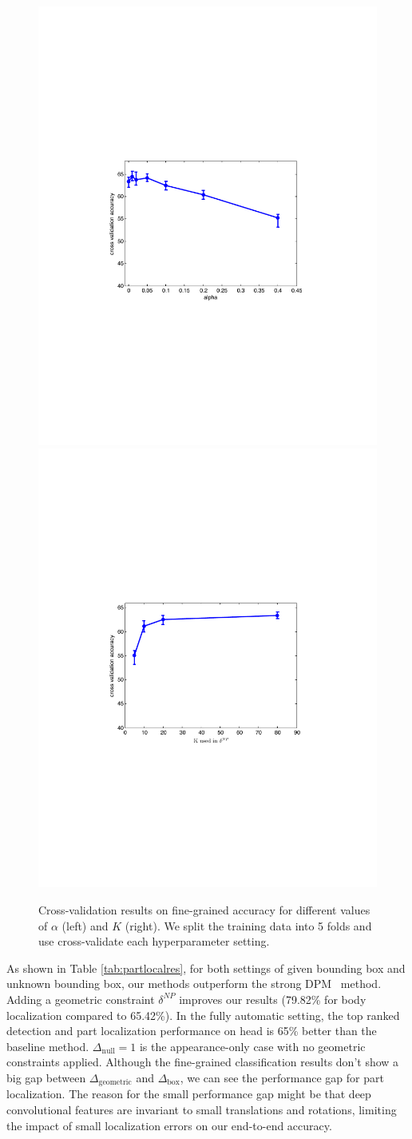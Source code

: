\begin{figure}[t]
\begin{center}
\includegraphics[width=0.45\linewidth]{alpha_plot.pdf}
\includegraphics[width=0.45\linewidth]{K_plot.pdf}
\end{center}
\caption{Cross-validation results on fine-grained accuracy for different values of $\alpha$ (left) and $K$ (right). We split the training data into 5 folds and use cross-validate each hyperparameter setting.}
\label{fig:crossvalidationalphak}
\end{figure}




As shown in Table \ref{tab:partlocalres}, for both settings of given bounding box and unknown bounding box, our methods outperform the strong DPM~\cite{Hossein_ECCV12} method.
Adding a geometric constraint $\delta^{NP}$ improves our results (79.82\% for body localization compared to 65.42\%). In the fully automatic setting, the top ranked detection and part localization performance on head is 65\% better than the baseline method. $\Delta_{\mathrm{null}}=1$ is the appearance-only case with no geometric constraints applied. Although the fine-grained classification results don't show a big gap between $\Delta_{\mathrm{geometric}}$ and $\Delta_{\mathrm{box}}$, we can see the performance gap for part localization.
The reason for the small performance gap might be that deep convolutional features are invariant to small translations and rotations,
limiting the impact of small localization errors on our end-to-end accuracy.


